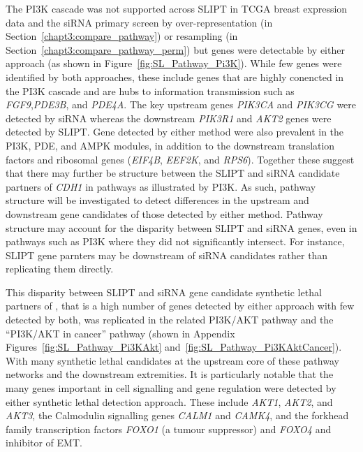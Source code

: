 \begin{figure*}[!htb]
  \begin{center}
   }
   \end{center}
   \caption[Synthetic Lethality in the PI3K Cascade]{\small \textbf{Synthetic Lethality in the PI3K Cascade.} The Reactome PI3K Cascade pathway with synthetic lethal candidates coloured as shown in the legend.
}
\label{fig:SL_Pathway_Pi3K}
\end{figure*}

The \gls{PI3K} cascade was not supported across \gls{SLIPT} in TCGA breast expression data and the \gls{siRNA} primary screen by over-representation (in Section~\ref{chapt3:compare_pathway}) or resampling (in Section~\ref{chapt3:compare_pathway_perm}) but genes were detectable by either approach (as shown in Figure~\ref{fig:SL_Pathway_Pi3K}).  While few genes were identified by both approaches, these include genes that are highly conencted in the PI3K cascade and are hubs to information transmission such as \textit{FGF9},\textit{PDE3B}, and \textit{PDE4A}. The key upstream genes \textit{PIK3CA} and \textit{PIK3CG} were detected by \gls{siRNA} whereas the downstream \textit{PIK3R1} and \textit{AKT2} genes were detected by \gls{SLIPT}. Gene detected by either method were also prevalent in the \gls{PI3K}, \gls{PDE}, and \gls{AMPK} modules, in addition to the downstream translation factors and ribosomal genes (\textit{EIF4B}, \textit{EEF2K}, and \textit{RPS6}). Together these suggest that there may further be structure between the \gls{SLIPT} and \gls{siRNA} candidate partners of \textit{CDH1} in pathways as illustrated by \gls{PI3K}. As such, pathway structure will be investigated to detect differences in the upstream and downstream gene candidates of those detected by either method. Pathway structure may account for the disparity between \gls{SLIPT} and \gls{siRNA} genes, even in pathways such as PI3K where they did not significantly intersect. For instance, \gls{SLIPT} gene parnters may be downstream of \gls{siRNA} candidates rather than replicating them directly.

This disparity between \gls{SLIPT} and \gls{siRNA} gene candidate synthetic lethal partners of , that is a high number of genes detected by either approach with few detected by both, was replicated in the related PI3K/AKT pathway and the ``PI3K/AKT in cancer'' pathway (shown in Appendix Figures~\ref{fig:SL_Pathway_Pi3KAkt} and~\ref{fig:SL_Pathway_Pi3KAktCancer}). With many synthetic lethal candidates at the upstream core of these pathway networks and the downstream extremities. It is particularly notable that the many genes important in cell signalling and gene regulation were detected by either synthetic lethal detection approach. These include \textit{AKT1}, \textit{AKT2}, and \textit{AKT3}, the Calmodulin signalling genes \textit{CALM1} and \textit{CAMK4}, and the forkhead family transcription factors \textit{FOXO1} (a tumour suppressor) and \textit{FOXO4} and inhibitor of \gls{EMT}.

